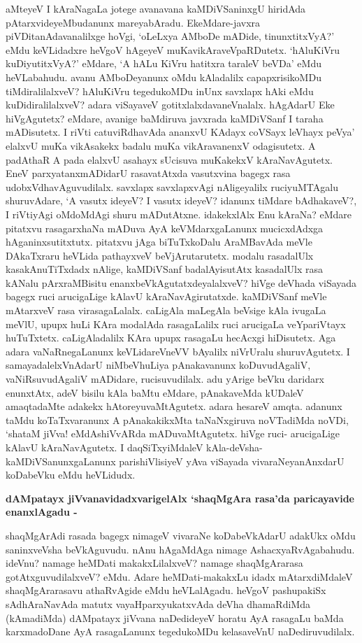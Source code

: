 \noindent
aMteyeV I kAraNagaLa jotege avanavana kaMDiVSaninxgU hiridAda pAtarx\-videyeMbudanunx mareya\-bAradu. EkeMdare-javxra piVDitanAdavanalilxge hoVgi, `oLeLxya AMboDe mADide, tinunx\-titxVyA?' eMdu keVLi\-dadxre heVgoV hAgeyeV muKavikAraveVpaRDutetx. `hAluKiVru kuDiyutitxVyA?' eMdare, `A hALu KiVru hatitxra taraleV beVDa' eMdu heVLabahudu. avanu AMboDeyanunx oMdu kAladalilx capapx\-risikoMDu tiMdiralilalxveV? hAluKiVru tegedukoMDu inUnx savxlapx hAki eMdu kuDidiralilalxveV? adara viSayaveV gotitxlalxdavaneVnalalx. hAgAdarU Eke hiVgAgutetx? eMdare, avanige baMdiruva javxrada kaMDiVSanf I taraha mADisutetx. I riVti catuviRdhavAda ananxvU KAdayx coVSayx leVhayx peVya' elalxvU muKa vikAsakekx badalu muKa vikAravanenxV odagisutetx. A padAthaR A pada elalxvU asahayx\- sUci\-suva muKakekxV kAraNavAgutetx. EneV parxyatanxmADidarU rasavatAtxda vasutxvina bagegx rasa udobxVdhavAgu\-vudilalx. savxlapx savxlapxvAgi nAligeyalilx ruciyuMTAgalu shuruvAdare, `A vasutx ideyeV? I vasutx ideyeV? idanunx tiMdare bAdhakaveV?, I riVtiyAgi oMdoMdAgi shuru mADutAtxne. idakekxlAlx Enu kAraNa? eMdare pitatxvu rasagarxhaNa mADuva AyA keVMdarxgaLanunx mucicxdAdxga hAganinxsutitxtutx. pitatxvu jAga biTuTxkoDalu AraMBavAda meVle DAkaTxraru heVLida pathayxveV beVjArutarutetx. modalu rasadalUlx kasakAnuTiTxdadx nAlige, kaMDiVSanf badalAyisutAtx kasadalUlx rasa kANalu pArxraMBisitu enanxbeVkAgutatxde\-yalalxveV? hiVge deVhada viSayada bagegx ruci arucigaLige kAlavU kAraNavAgirutatxde. kaMDiVSanf meVle mAtarxveV rasa virasagaLalalx. caLigAla maLegAla beVsige kAla ivugaLa meVlU, upupx huLi KAra moda\-lAda rasagaLalilx ruci arucigaLa veYpariVtayx huTuTxtetx. caLigAladalilx KAra upupx rasagaLu hecAcxgi hiDi\-sutetx. Aga adara vaNaRnegaLanunx keVLidareVneVV bAyalilx niVrUralu shuruvAgutetx. I samayadalelxV\-nAdarU niMbeVhuLiya pAnakavanunx koDuvudAgaliV, vaNiRsuvu\-dAgaliV mADidare, rucisuvu\-dilalx. adu yArige beVku daridarx enunxtAtx, adeV bisilu kAla baMtu eMdare, pAnakaveMda kUDaleV amaqtadaMte adakekx hAtoreyuvaMtAgutetx. adara hesareV amqta. adanunx taMdu koTaTxva\-ranunx A pAnakakikxMta taNaNxgiruva noVTadiMda noVDi, `shataM jiVva! eMdAshiVvARda mADuvaMtAgutetx. hiVge ruci- arucigaLige kAlavU kAraNavAgutetx. I daqSiTxyiMdaleV kAla-deVsha-kaMDiVSanunxgaLanunx parishiVlisiyeV yAva viSayada vivaraNeyanAnxdarU koDabeVku eMdu heVLidudx.

{\bigskip
\noindent
{\large\bf dAMpatayx jiVvanavidadxvarigelAlx `shaqMgAra rasa'da paricayavide enanxlAgadu -}}\label{page221}
\medskip

\noindent
shaqMgArAdi rasada bagegx nimageV vivaraNe koDabeVkAdarU adakUkx oMdu saninx\-veVsha beVkAgu\-vudu. nAnu hAgaMdAga nimage AshacxyaRvAgabahudu. ideVnu? namage heMDati makakxLilalxveV? namage shaqMgArarasa gotAtxguvudilalxveV? eMdu. Adare heMDati-makakxLu idadx mAtarxdiMdaleV shaqMgArarasavu athaRvAgide eMdu heVLalAgadu. heVgoV pashupakiSx sAdhAraNavAda matutx vayaH\-parxyukatxvAda \hbox{deVha} dhamaRdiMda (kAmadiMda) dAMpatayx jiVvana naDedideyeV horatu AyA rasagaLu baMda karxmadoDane AyA rasagaLanunx tegedukoMDu kelasaveVnU naDediruvudilalx.

